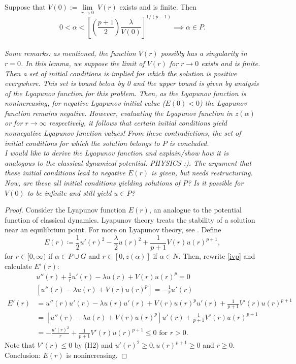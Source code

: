 \newpage
\begin{lemma}\label{lya}Suppose that $V(0):=\underset{r\to0}{\lim}~V(r)$ exists and is finite. Then $$0<\alpha<\left[\left(\frac{p+1}{2}\right)\frac{\lambda}{V(0)} \right]^{1/(p-1)}\implies \alpha\in P.$$\\
\emph{\color{teal}Some remarks: as mentioned, the function $V(r)$ possibly has a singularity in $r=0$. In this lemma, we suppose the limit of $V(r)$ for $r\to0$ exists and is finite. Then a set of initial conditions is implied for which the solution is positive everywhere. This set is bound below by 0 and the upper bound is given by analysis of the Lyapunov function for this problem. Then, as the Lyapunov function is nonincreasing, for negative Lyapunov initial value ($E(0)<0$) the Lyapunov function remains negative. However, evaluating the Lyapunov function in $z(\alpha)$ or for $r\to\infty$ respectively, it follows that certain initial conditions yield nonnegative Lyapunov function values! From these contradictions, the set of initial conditions for which the solution belongs to $P$ is concluded.}\\[11pt]
\emph{\color{red}I would like to derive the Lyapunov function and explain/show how it is analogous to the classical dynamical potential. PHYSICS :). The argument that these initial conditions lead to negative $E(r)$ is given, but needs restructuring. Now, are these all initial conditions yielding solutions of $P$? Is it possible for $V(0)$ to be infinite and still yield $u\in P$?}

\begin{proof}
Consider the Lyapunov function $E(r)$, an analogue to the potential function of classical dynamics. Lyapunov theory treats the stability of a solution near an equilibrium point. For more on Lyapunov theory, see \cite{}. Define $$E(r)\coloneqq\frac{1}{2}u'(r)^2-\frac{\lambda}{2}u(r)^2+\frac{1}{p+1}V(r)u(r)^{p+1},$$  for $r\in[0,\infty)$ if $\alpha\in P\cup G$ and $r\in[0,z(\alpha)]$ if $\alpha\in N$. Then, rewrite \ref{ivp} and calculate $E'(r)$: \begin{align*} &u''(r)+\frac{1}{r}u'(r)-\lambda u(r)+V(r)u(r)^p=0\\
&\left[u''(r)-\lambda u(r)+V(r)u(r)^p\right]=-\frac{1}{r}u'(r)\\
E'(r)&=u''(r)u'(r)-\lambda u(r)u'(r)+V(r)u(r)^pu'(r)+\frac{1}{p+1}V'(r)u(r)^{p+1}\\
&=\left[u''(r)-\lambda u(r)+V(r)u(r)^p\right]u'(r)+\frac{1}{p+1}V'(r)u(r)^{p+1}\\
&=-\frac{u'(r)^2}{r}+\frac{1}{p+1}V'(r)u(r)^{p+1}\leq0\text{ for }r>0.
\end{align*} Note that $V'(r)\leq0$ by (H2) and $u'(r)^2\geq0, u(r)^{p+1}\geq0$ and $r\geq0$. Conclusion: $E(r)$ is nonincreasing.


\end{proof}
\end{lemma}
